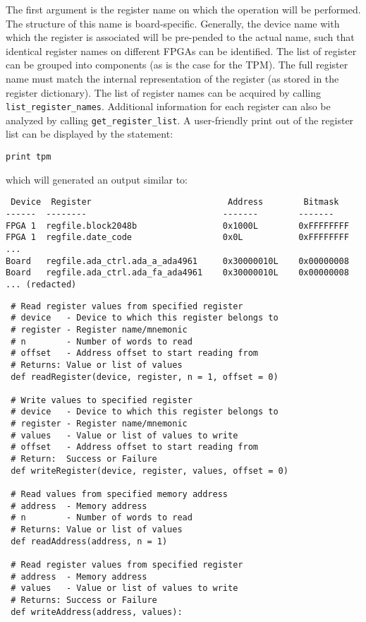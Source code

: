 \documentclass[a4paper,11pt]{article}
\begin{document}
The first argument is the register name on which the operation will be 
performed. The structure of this name is board-specific. Generally, the device 
name with which the register is associated will be pre-pended to the actual 
name, such that identical register names on different FPGAs can be identified. 
The list of register can be grouped into components (as is the case for the 
TPM). The full register name must match the internal representation of the 
register (as stored in the register dictionary). The list of register names can 
be acquired by calling \texttt{list\_register\_names}. Additional information 
for each register can also be analyzed by calling \texttt{get\_register\_list}. 
A user-friendly print out of the register list can be displayed by the 
statement:
\begin{lstlisting}[belowskip=-1 \baselineskip]
print tpm
\end{lstlisting}
which will generated an output similar to:
\begin{lstlisting}
 Device  Register                           Address        Bitmask
------  --------                           -------        -------
FPGA 1	regfile.block2048b                 0x1000L        0xFFFFFFFF
FPGA 1	regfile.date_code                  0x0L           0xFFFFFFFF
...
Board   regfile.ada_ctrl.ada_a_ada4961     0x30000010L    0x00000008
Board   regfile.ada_ctrl.ada_fa_ada4961    0x30000010L    0x00000008
... (redacted)
\end{lstlisting}

\begin{lstlisting}
 # Read register values from specified register
 # device   - Device to which this register belongs to
 # register - Register name/mnemonic
 # n        - Number of words to read
 # offset   - Address offset to start reading from
 # Returns: Value or list of values
 def readRegister(device, register, n = 1, offset = 0)
 
 # Write values to specified register
 # device   - Device to which this register belongs to
 # register - Register name/mnemonic
 # values   - Value or list of values to write
 # offset   - Address offset to start reading from
 # Return:  Success or Failure
 def writeRegister(device, register, values, offset = 0)
 
 # Read values from specified memory address
 # address  - Memory address
 # n        - Number of words to read
 # Returns: Value or list of values
 def readAddress(address, n = 1)
 
 # Read register values from specified register
 # address  - Memory address
 # values   - Value or list of values to write
 # Returns: Success or Failure
 def writeAddress(address, values):
\end{lstlisting}
\end{document}
